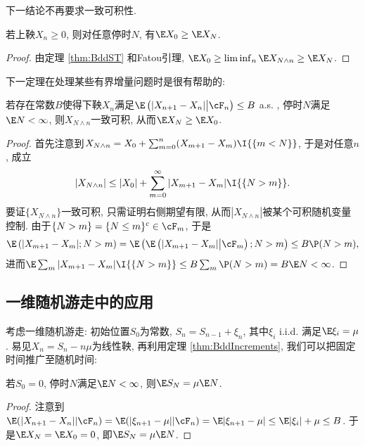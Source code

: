 \documentclass[a4paper, 10pt]{ctexart}
\begin{document}
下一结论不再要求一致可积性. 
\begin{theorem}
	若上鞅$X_n \geq 0$, 则对任意停时$N$, 有$\E X_0 \geq \E X_N$. 
\end{theorem}
\begin{proof}
	由定理 \ref{thm:BddST} 和Fatou引理, $\E X_0 \geq \liminf_{n} \E X_{N \wedge n} \geq \E X_N$. 
\end{proof}

下一定理在处理某些有界增量问题时是很有帮助的: 
\begin{theorem}\label{thm:BddIncrements}
	若存在常数$B$使得下鞅$X_n$满足$\E\left(|X_{n+1} - X_n| \big| \cF_n \right) \leq B$ a.s. , 停时$N$满足$\E N < \infty$, 则$X_{N \wedge n}$一致可积, 从而$\E X_N \geq \E X_0$. 
\end{theorem}
\begin{proof}
	首先注意到$X_{N \wedge n} = X_0 + \sum_{m = 0}^{n} (X_{m + 1} - X_m) \I{\{m < N\}}$, 于是对任意$n$, 成立
	\begin{equation*}
		|X_{N \wedge n}| \leq |X_0| + \sum_{m = 0}^{\infty} |X_{m+1} - X_m| \I{\{N > m\}}.  
	\end{equation*}
	要证$\{ X_{N \wedge n} \}$一致可积, 只需证明右侧期望有限, 从而$|X_{N \wedge n}|$被某个可积随机变量控制. 
	由于$\{N > m\} = \{N \leq m\}^c \in \cF_m$, 于是
	\begin{align*}
		\E\left(|X_{m+1} - X_m|; N>m \right)
		= \E\left( \E\left(|X_{m+1} - X_m|\big|\cF_m \right); N>m \right)
		\leq B \P(N > m), 
	\end{align*}
	进而$\E \sum_m |X_{m+1} - X_m| \I{\{N > m\}} \leq B \sum_m \P(N > m) = B \E N < \infty$. 
\end{proof}

\subsection{一维随机游走中的应用}

考虑一维随机游走: 初始位置$S_0$为常数, $S_n = S_{n-1} + \xi_n$, 其中$\xi_i$ i.i.d. 满足$\E \xi_i = \mu$. 
易见$X_n = S_n - n \mu$为线性鞅, 再利用定理 \ref{thm:BddIncrements}, 我们可以把固定时间推广至随机时间: 
\begin{theorem}[Wald等式]
	若$S_0 = 0$, 停时$N$满足$\E N < \infty$, 则$\E S_N = \mu \E N$. 
\end{theorem} 
\begin{proof}
	注意到$\E(|X_{n+1} - X_n| | \cF_n) = \E(|\xi_{n+1} - \mu||\cF_n) = \E|\xi_{n+1} - \mu| \leq \E|\xi_i| + \mu \leq B$. 
	于是$\E X_N = \E X_0 = 0$, 即$\E S_N = \mu \E N$. 
\end{proof}
\end{document}
